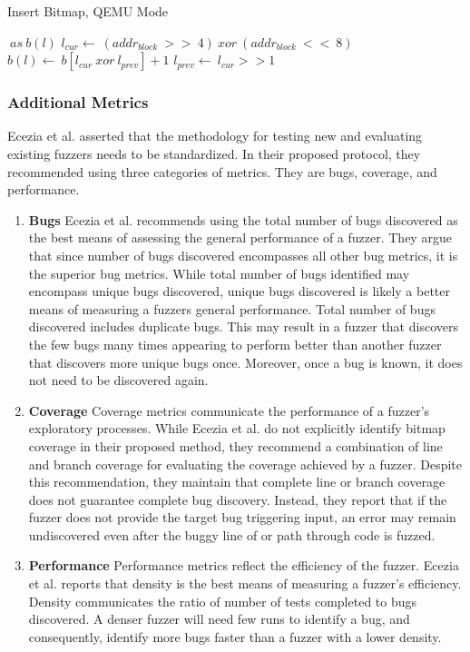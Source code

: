 \begin{algorithm}
    \caption {Insert Bitmap, QEMU Mode}\label{qemu_bitmap}
    \begin{algorithmic}[1]
        $\ as\ b(l)$
                \State $l_{cur} \gets\ (addr_{block}\ >>\ 4)\ xor\ (addr_{block}\ <<\ 8)$
                \State $b(l) \gets\ b[l_{cur}\  xor\  l_{prev}] + 1$
                \State $l_{prev} \gets\ l_{cur} >> 1$
          \EndIf
        \EndProcedure
    \end{algorithmic}
\end{algorithm}

\subsubsection{Additional Metrics}
Ecezia et al. \cite{eceiza_improving_2023} asserted that the methodology for testing new and 
evaluating existing fuzzers needs to be standardized. In their proposed protocol, they 
recommended using three categories of metrics. They are bugs, coverage, and performance. 

\begin{enumerate}
    \item \textbf{Bugs} Ecezia et al. recommends using the total number of
    bugs discovered as the best means of assessing the general performance 
    of a fuzzer. They argue that since number of bugs discovered 
    encompasses all other bug metrics, it is the superior bug metrics. 
    While total number of bugs identified may encompass unique bugs 
    discovered, unique bugs discovered is likely a better means of 
    measuring a fuzzers general performance. Total number of bugs 
    discovered includes duplicate bugs. This may result in a fuzzer that 
    discovers the few bugs many times appearing to perform better than 
    another fuzzer that discovers more unique bugs once. Moreover, once a 
    bug is known, it does not need to be discovered again.
    \item \textbf{Coverage} Coverage metrics communicate the performance 
    of a fuzzer's exploratory processes. While Ecezia et al. do not 
    explicitly identify bitmap coverage in their proposed method, they 
    recommend a combination of line and branch coverage for evaluating the 
    coverage achieved by a fuzzer. Despite this recommendation, they 
    maintain that complete line or branch coverage does not guarantee 
    complete bug discovery. Instead, they report that if the fuzzer does 
    not provide the target bug triggering input, an error may remain 
    undiscovered even after the buggy line of or path through code is 
    fuzzed. 
    \item \textbf{Performance} Performance metrics reflect the efficiency 
    of the fuzzer. Ecezia et al. reports that density is the best means of 
    measuring a fuzzer's efficiency. Density communicates the ratio of 
    number of tests completed to bugs discovered. A denser fuzzer will 
    need few runs to identify a bug, and consequently, identify more bugs 
    faster than a fuzzer with a lower density. 
\end{enumerate}


